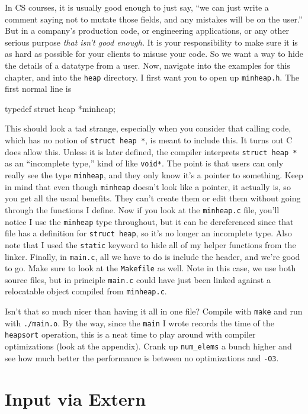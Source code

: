 \documentclass[ebook,11pt,oneside,openany]{memoir}
\newcommand{\cf}[1]{\texttt{#1}}
\begin{document}
In CS courses, it is usually good enough to just say, ``we can just write a comment saying not to mutate those fields, and any mistakes will be on the user.'' But in a company's production code, or engineering applications, or any other serious purpose \textit{that isn't good enough.} It is your responsibility to make sure it is as hard as possible for your clients to misuse your code. So we want a way to hide the details of a datatype from a user. Now, navigate into the examples for this chapter, and into the \cf{heap} directory. I first want you to open up \cf{minheap.h}. The first normal line is 

\begin{code}[language=C]
typedef struct heap *minheap;
\end{code}

This should look a tad strange, especially when you consider that calling code, which has no notion of \cf{struct heap *}, is meant to include this. It turns out C does allow this. Unless it is later defined, the compiler interprets \cf{struct heap *} as an ``incomplete type,'' kind of like \cf{void*}. The point is that users can only really see the type \cf{minheap}, and they only know it's a pointer to something. Keep in mind that even though \cf{minheap} doesn't look like a pointer, it actually is, so you get all the usual benefits. They can't create them or edit them without going through the functions I define. Now if you look at the \cf{minheap.c} file, you'll notice I use the \cf{minheap} type throughout, but it can be dereferenced since that file has a definition for \cf{struct heap}, so it's no longer an incomplete type. Also note that I used the \cf{static} keyword to hide all of my helper functions from the linker. Finally, in \cf{main.c}, all we have to do is include the header, and we're good to go. Make sure to look at the \cf{Makefile} as well. Note in this case, we use both source files, but in principle \cf{main.c} could have just been linked against a relocatable object compiled from \cf{minheap.c}.

Isn't that so much nicer than having it all in one file? Compile with \cf{make} and run with \cf{./main.o}. By the way, since the \cf{main} I wrote records the time of the \cf{heapsort} operation, this is a neat time to play around with compiler optimizations (look at the appendix). Crank up \cf{num\_elems} a bunch higher and see how much better the performance is between no optimizations and \cf{-O3}.

\section{Input via Extern}
\end{document}
